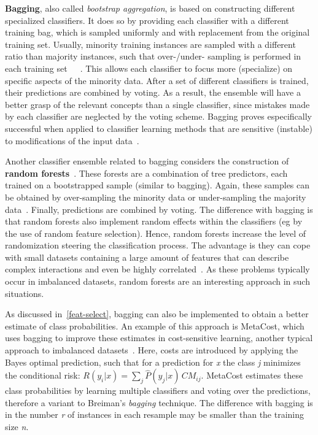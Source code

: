 \textbf{Bagging}, also called \textit{bootstrap aggregation}, is based on constructing different specialized classifiers. It does so by providing each classifier with a different training bag, which is sampled uniformly and with replacement from the original training set. Usually, minority training instances are sampled with a different ratio than majority instances, such that over-/under- sampling is performed in each training set~\cite{1137548}~\cite{Breiman96b}~\cite{confsdmHidoK08}. This allows each classifier to focus more (specialize) on specific aspects of the minority data. After a set of different classifiers is trained, their predictions are combined by voting. As a result, the ensemble will have a better grasp of the relevant concepts than a single classifier, since mistakes made by each classifier are neglected by the voting scheme. Bagging proves especifically successful when applied to classifier learning methods that are sensitive (instable) to modifications of the input data~\cite{Breiman94Heur}.

Another classifier ensemble related to bagging considers the construction of \textbf{random forests}~\cite{Breiman01randomforests}. These forests are a combination of tree predictors, each trained on a bootstrapped sample (similar to bagging). Again, these samples can be obtained by over-sampling the minority data or under-sampling the majority data~\cite{Chen04RF}. Finally, predictions are combined by voting. The difference with bagging is that random forests also implement random effects within the classifiers (eg by the use of random feature selection). Hence, random forests increase the level of randomization steering the classification process. The advantage is they can cope with small datasets containing a large amount of features that can describe complex interactions and even be highly correlated~\cite{strobl08why}. As these problems typically occur in imbalanced datasets, random forests are an interesting approach in such situations.

As discussed in~\ref{feat-select}, bagging can also be implemented to obtain a better estimate of class probabilities. An example of this approach is MetaCost, which uses bagging to improve these estimates in cost-sensitive learning, another typical approach to imbalanced datasets~\cite{domingos99MetaCost}. Here, costs are introduced by applying the Bayes optimal prediction, such that for a prediction for \textit{x} the class \textit{j} minimizes the conditional risk: \(R(y_i|x) = \sum_{j}\widehat{P}(y_j|x)\,CM_{ij}\). MetaCost estimates these class probabilities by learning multiple classifiers and voting over the predictions, therefore a variant to Breiman's \textit{bagging} technique. The difference with bagging is in the number \textit{r} of instances in each resample may be smaller than the training size \textit{n}.


